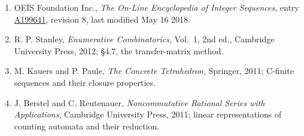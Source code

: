 \documentclass[11pt]{article}
\theoremstyle{definition}
\begin{document}
\begin{enumerate}

\item OEIS Foundation Inc., \emph{The On-Line Encyclopedia of Integer Sequences}, entry \href{https://oeis.org/A199641}{A199641}, revision 8, last modified May 16 2018.

\item R. P. Stanley, \emph{Enumerative Combinatorics}, Vol.~1, 2nd ed., Cambridge University Press, 2012; \S4.7, the transfer-matrix method.

\item M. Kauers and P. Paule, \emph{The Concrete Tetrahedron}, Springer, 2011; C-finite sequences and their closure properties.

\item J. Berstel and C. Reutenauer, \emph{Noncommutative Rational Series with Applications}, Cambridge University Press, 2011; linear representations of counting automata and their reduction.

\end{enumerate}
\end{document}
